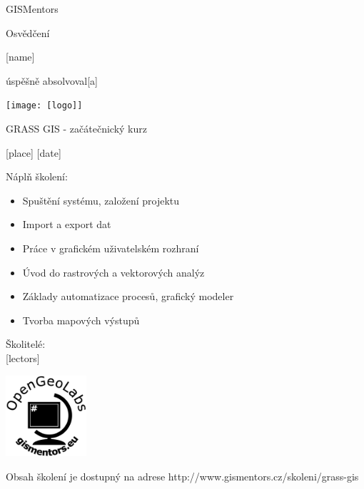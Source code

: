 \documentclass[12pt, a4paper]{letter}
\begin{document}
\pagestyle{empty}
\begin{center}

{\Large GISMentors}

{\Huge Osvědčení}

{\Large [name]}

úspěšně absolvoval[a]

\texttt{[image: [logo]]}

{\Large GRASS GIS - začátečnický kurz}

[place] [date]
\end{center}

Náplň školení:

\begin{itemize}
    \item Spuštění systému, založení projektu
    \item Import a export dat
    \item Práce v grafickém uživatelském rozhraní
    \item Úvod do rastrových a vektorových analýz
    \item Základy automatizace procesů, grafický modeler
    \item Tvorba mapových výstupů
\end{itemize}

\vfill
\parbox{7cm}{

    Školitelé: \\

    [lectors]

}
\hfill
\parbox{3cm}{
        \includegraphics[width=3cm]{images/placka-eps-converted-to.pdf}
}

\vfill

\begin{center}
{\footnotesize Obsah školení je dostupný na adrese
http://www.gismentors.cz/skoleni/grass-gis}
\end{center}
\end{document}
